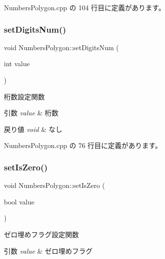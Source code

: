  Numbers\+Polygon.\+cpp の 104 行目に定義があります。

\mbox{\label{class_numbers_polygon_a288c5cc3e3146e8c6bddf8c63368f38e}} 
\subsubsection{\texorpdfstring{set\+Digits\+Num()}{setDigitsNum()}}
{\footnotesize\ttfamily void Numbers\+Polygon\+::set\+Digits\+Num (\begin{DoxyParamCaption}\item[{int}]{value }\end{DoxyParamCaption})}



桁数設定関数 


\begin{DoxyParams}{引数}
{\em value} & 桁数 \\
\hline
\end{DoxyParams}

\begin{DoxyRetVals}{戻り値}
{\em void} & なし \\
\hline
\end{DoxyRetVals}


 Numbers\+Polygon.\+cpp の 76 行目に定義があります。

\mbox{\label{class_numbers_polygon_aa769b0fa962f4c3a1e0c8229e1b22e6b}} 
\subsubsection{\texorpdfstring{set\+Is\+Zero()}{setIsZero()}}
{\footnotesize\ttfamily void Numbers\+Polygon\+::set\+Is\+Zero (\begin{DoxyParamCaption}\item[{bool}]{value }\end{DoxyParamCaption})}



ゼロ埋めフラグ設定関数 


\begin{DoxyParams}{引数}
{\em value} & ゼロ埋めフラグ \\
\hline
\end{DoxyParams}

